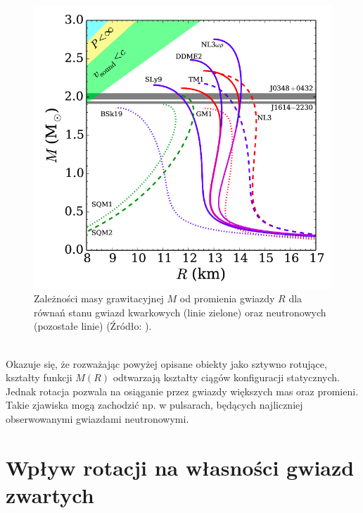 \documentclass{bachelor_thesis}
\begin{document}
        \begin{figure}[h!]
            \centering
            \includegraphics[scale=.31]{figures/RysEOS2.png}
            \caption{Zależności masy grawitacyjnej $M$ od promienia gwiazdy $R$ dla równań stanu gwiazd kwarkowych (linie zielone) oraz neutronowych (pozostałe linie) (Źródło: \citealp{Haensel2007}).}
            \label{RysEOS}
        \end{figure}\\
        \indent Okazuje się, że rozważając powyżej opisane obiekty jako sztywno rotujące, kształty funkcji $M(R)$ odtwarzają kształty ciągów konfiguracji statycznych. Jednak rotacja pozwala na osiąganie przez gwiazdy większych mas oraz promieni. Takie zjawiska mogą zachodzić np. w pulsarach, będących najliczniej obserwowanymi gwiazdami neutronowymi.
        \section{Wpływ rotacji na własności gwiazd zwartych}
\end{document}
